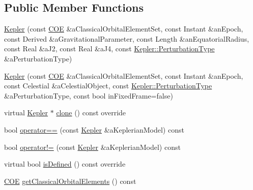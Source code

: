 \subsection*{Public Member Functions}
\begin{DoxyCompactItemize}
\item 
\hyperlink{classostk_1_1astro_1_1trajectory_1_1orbit_1_1models_1_1_kepler_aebd9792c0965b4539a553afad07aff7a}{Kepler} (const \hyperlink{classostk_1_1astro_1_1trajectory_1_1orbit_1_1models_1_1kepler_1_1_c_o_e}{C\+OE} \&a\+Classical\+Orbital\+Element\+Set, const Instant \&an\+Epoch, const Derived \&a\+Gravitational\+Parameter, const Length \&an\+Equatorial\+Radius, const Real \&a\+J2, const Real \&a\+J4, const \hyperlink{classostk_1_1astro_1_1trajectory_1_1orbit_1_1models_1_1_kepler_a3750f9177ff06a1938826e2c2881d5a9}{Kepler\+::\+Perturbation\+Type} \&a\+Perturbation\+Type)
\item 
\hyperlink{classostk_1_1astro_1_1trajectory_1_1orbit_1_1models_1_1_kepler_afc95c7ec38bba8e24eba704c408523b6}{Kepler} (const \hyperlink{classostk_1_1astro_1_1trajectory_1_1orbit_1_1models_1_1kepler_1_1_c_o_e}{C\+OE} \&a\+Classical\+Orbital\+Element\+Set, const Instant \&an\+Epoch, const Celestial \&a\+Celestial\+Object, const \hyperlink{classostk_1_1astro_1_1trajectory_1_1orbit_1_1models_1_1_kepler_a3750f9177ff06a1938826e2c2881d5a9}{Kepler\+::\+Perturbation\+Type} \&a\+Perturbation\+Type, const bool in\+Fixed\+Frame=false)
\item 
virtual \hyperlink{classostk_1_1astro_1_1trajectory_1_1orbit_1_1models_1_1_kepler}{Kepler} $\ast$ \hyperlink{classostk_1_1astro_1_1trajectory_1_1orbit_1_1models_1_1_kepler_afb76b3571c73fb5c87129033f7d66520}{clone} () const override
\item 
bool \hyperlink{classostk_1_1astro_1_1trajectory_1_1orbit_1_1models_1_1_kepler_a0fa60d97287b75564e1e5a2390f137f4}{operator==} (const \hyperlink{classostk_1_1astro_1_1trajectory_1_1orbit_1_1models_1_1_kepler}{Kepler} \&a\+Keplerian\+Model) const
\item 
bool \hyperlink{classostk_1_1astro_1_1trajectory_1_1orbit_1_1models_1_1_kepler_aac43844f43000a181bf504529763bc82}{operator!=} (const \hyperlink{classostk_1_1astro_1_1trajectory_1_1orbit_1_1models_1_1_kepler}{Kepler} \&a\+Keplerian\+Model) const
\item 
virtual bool \hyperlink{classostk_1_1astro_1_1trajectory_1_1orbit_1_1models_1_1_kepler_a4c74402d5483a51e5e0fe1920cd52ec4}{is\+Defined} () const override
\item 
\hyperlink{classostk_1_1astro_1_1trajectory_1_1orbit_1_1models_1_1kepler_1_1_c_o_e}{C\+OE} \hyperlink{classostk_1_1astro_1_1trajectory_1_1orbit_1_1models_1_1_kepler_a1a5e2d4a27c4e20d91924a3a751cbba4}{get\+Classical\+Orbital\+Elements} () const

\end{DoxyCompactItemize}
